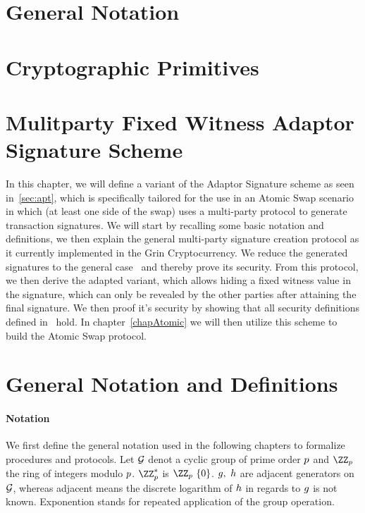 \section{General Notation}\label{secGenNot}
\section{Cryptographic Primitives}\label{secCrypPrim}
\section{Mulitparty Fixed Witness Adaptor Signature Scheme} \label{sec:secscheme}

In this chapter, we will define a variant of the Adaptor Signature scheme as seen in~\ref{sec:apt},
which is specifically tailored for the use in an Atomic Swap scenario in which (at least one side of the swap) uses a multi-party protocol to generate transaction signatures.
We will start by recalling some basic notation and definitions, we then explain the general multi-party signature creation protocol as it currently implemented in the Grin Cryptocurrency.
We reduce the generated signatures to the general case~\cite{schnorr1991efficient} and thereby prove its security. From this protocol, we then derive the adapted variant, which allows hiding a fixed witness
value in the signature, which can only be revealed by the other parties after attaining the final signature.
We then proof it's security by showing that all security definitions defined in~\cite{sanches2020bitcoinchannels} hold.
In chapter~\ref{chapAtomic} we will then utilize this scheme to build the Atomic Swap protocol.

\section{General Notation and Definitions}

\paragraph{Notation}
We first define the general notation used in the following chapters to formalize procedures and protocols. Let $\mathcal{G}$ denot a cyclic group of prime order $p$ and $\cnstIntegersPrime{\varPrime}$
the ring of integers modulo $p$. $\cnstIntegersPrimeWithoutZero{\varPrime}$ is $\cnstIntegersPrime{\varPrime} \opExcluding \funList{0}$. $g ,~ h$ are adjacent
generators on $\mathcal{G}$, whereas adjacent means the discrete logarithm of $h$ in regards to $g$ is not known. Exponention stands for repeated application of the group operation.

